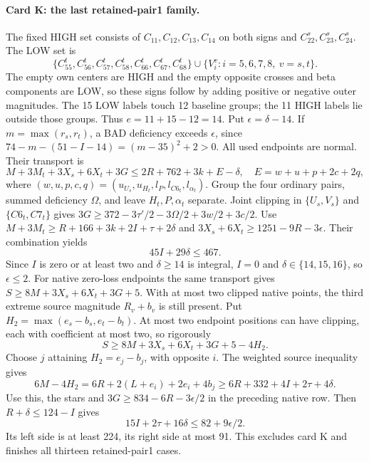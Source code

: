 \documentclass[11pt,letterpaper]{article}
\theoremstyle{definition}\newtheorem{definition}[theorem]{Definition}
\begin{document}
\paragraph{Card K: the last retained-pair1 family.}
The fixed HIGH set consists of $C_{11},C_{12},C_{13},C_{14}$ on both
signs and $C_{22}^s,C_{23}^s,C_{24}^s$. The LOW set is
\[
 \{C_{55}^t,C_{56}^t,C_{57}^t,C_{58}^t,C_{66}^t,C_{67}^t,C_{68}^t\}
 \cup\{V_i^v: i=5,6,7,8,\ v=s,t\}.
\]
The empty own centers are HIGH and the empty opposite crosses and beta
components are LOW, so these signs follow by adding positive or negative
outer magnitudes. The 15 LOW labels touch 12 baseline groups; the 11
HIGH labels lie outside those groups. Thus $e=11+15-12=14$.
Put $\epsilon=\delta-14$. If $m=\max(r_s,r_t)$, a BAD deficiency
exceeds $\epsilon$, since
$74-m-(51-I-14)=(m-35)^2+2>0$. All used endpoints are normal.
Their transport is
\[
 M+3M_t+3X_s+6X_t+3G\le2R+762+3k+E-\delta,
 \quad E=w+u+p+2c+2q,
\]
where $(w,u,p,c,q)=(u_{U_s},u_{H_t},l_P,l_{C6_t},l_{\alpha_t})$.
Group the four ordinary pairs, summed deficiency $\Omega$, and leave
$H_t,P,\alpha_t$ separate. Joint clipping in $\{U_s,V_s\}$ and
$\{C6_t,C7_t\}$ gives
$3G\ge372-3\tau'/2-3\Omega/2+3w/2+3c/2$.
Use $M+3M_t\ge R+166+3k+2I+\tau+2\delta$ and
$3X_s+6X_t\ge1251-9R-3\epsilon$. Their combination yields
\[
 45I+29\delta\le467.
\]
Since $I$ is zero or at least two and $\delta\ge14$ is integral,
$I=0$ and $\delta\in\{14,15,16\}$, so $\epsilon\le2$.
For native zero-loss endpoints the same transport gives
$S\ge8M+3X_s+6X_t+3G+5$. With at most two clipped native points,
the third extreme source magnitude $R_v+b_v$ is still present.
Put $H_2=\max(e_s-b_s,e_t-b_t)$. At most two endpoint positions can
have clipping, each with coefficient at most two, so rigorously
\[
 S\ge8M+3X_s+6X_t+3G+5-4H_2.
\]
Choose $j$ attaining $H_2=e_j-b_j$, with opposite $i$.
The weighted source inequality gives
\[
 6M-4H_2=6R+2(L+e_i)+2e_i+4b_j
 \ge6R+332+4I+2\tau+4\delta.
\]
Use this, the stars and $3G\ge834-6R-3\epsilon/2$ in the preceding
native row. Then $R+\delta\le124-I$ gives
\[
 15I+2\tau+16\delta\le82+9\epsilon/2.
\]
Its left side is at least 224, its right side at most 91. This excludes
card K and finishes all thirteen retained-pair1 cases.
\end{document}
